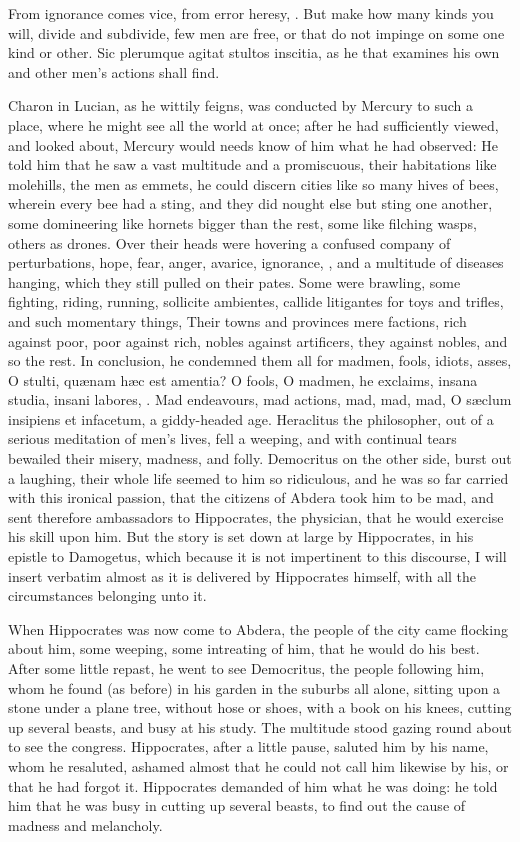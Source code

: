 {From ignorance comes vice, from error heresy, \etc. But make how many
kinds you will, divide and subdivide, few men are free, or that do not
impinge on some one kind or other. Sic plerumque agitat stultos
inscitia, as he that examines his own and other men's actions shall
find.

Charon in Lucian, as he wittily feigns, was conducted by Mercury
to such a place, where he might see all the world at once; after he had
sufficiently viewed, and looked about, Mercury would needs know of him
what he had observed: He told him that he saw a vast multitude and a
promiscuous, their habitations like molehills, the men as emmets, he
could discern cities like so many hives of bees, wherein every bee had
a sting, and they did nought else but sting one another, some
domineering like hornets bigger than the rest, some like filching
wasps, others as drones. Over their heads were hovering a confused
company of perturbations, hope, fear, anger, avarice, ignorance, \etc{},
and a multitude of diseases hanging, which they still pulled on their
pates. Some were brawling, some fighting, riding, running, sollicite
ambientes, callide litigantes for toys and trifles, and such momentary
things, Their towns and provinces mere factions, rich against poor,
poor against rich, nobles against artificers, they against nobles, and
so the rest. In conclusion, he condemned them all for madmen, fools,
idiots, asses, O stulti, qu\ae{}nam h\ae{}c est amentia? O fools, O madmen,
he exclaims, insana studia, insani labores, \etc{}. Mad endeavours, mad
actions, mad, mad, mad, O s\ae{}clum insipiens et infacetum, a
giddy-headed age. Heraclitus the philosopher, out of a serious
meditation of men's lives, fell a weeping, and with continual tears
bewailed their misery, madness, and folly. Democritus on the other
side, burst out a laughing, their whole life seemed to him so
ridiculous, and he was so far carried with this ironical passion, that
the citizens of Abdera took him to be mad, and sent therefore
ambassadors to Hippocrates, the physician, that he would exercise his
skill upon him. But the story is set down at large by Hippocrates, in
his epistle to Damogetus, which because it is not impertinent to this
discourse, I will insert verbatim almost as it is delivered by
Hippocrates himself, with all the circumstances belonging unto it.

When Hippocrates was now come to Abdera, the people of the city came
flocking about him, some weeping, some intreating of him, that he would
do his best. After some little repast, he went to see Democritus, the
people following him, whom he found (as before) in his garden in the
suburbs all alone, sitting upon a stone under a plane tree,
without hose or shoes, with a book on his knees, cutting up several
beasts, and busy at his study. The multitude stood gazing round about
to see the congress. Hippocrates, after a little pause, saluted him by
his name, whom he resaluted, ashamed almost that he could not call him
likewise by his, or that he had forgot it. Hippocrates demanded of him
what he was doing: he told him that he was busy in cutting up
several beasts, to find out the cause of madness and melancholy.

}
